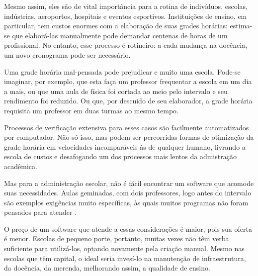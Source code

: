 \documentclass[12pt,a4paper]{article}
\begin{document}
		\par Mesmo assim, eles são de vital importância para a rotina de indivíduos, escolas, indústrias, aeroportos, hospitais e eventos esportivos. Instituições de ensino, em particular, tem custos enormes com a elaboração de suas grades horárias: estima-se que elaborá-las manualmente pode demandar centenas de horas \cite{appleby} de um profissional. No entanto, esse processo é rotineiro: a cada mudança na docência, um novo cronograma pode ser necessário.

		\par Uma grade horária mal-pensada pode prejudicar e muito uma escola. Pode-se imaginar, por exemplo, que esta faça um professor frequentar a escola em um dia a mais, ou que uma aula de física foi cortada ao meio pelo intervalo e seu rendimento foi reduzido. Ou que, por descuido de seu elaborador, a grade horária requisita um professor em duas turmas ao mesmo tempo.

		\par Processos de verificação extensiva para esses casos são facilmente automatizados por computador. Não só isso, mas podem ser percorridas formas de otimização da grade horária em velocidades incomparáveis às de qualquer humano, livrando a escola de custos e desafogando um dos processos mais lentos da admistração acadêmica.


		\par Mas para a administração escolar, não é fácil encontrar um software que acomode suas necessidades. Aulas geminadas, com dois professores, logo antes do intervalo são exemplos exigências muito específicas, às quais muitos programas não foram pensados para atender \cite{nikita}.

		\par O preço de um software que atende a essas considerações é maior, pois sua oferta é menor. Escolas de pequeno porte, portanto, muitas vezes não têm verba suficiente para utilizá-los, optando novamente pela criação manual. Mesmo nas escolas que têm capital, o ideal seria invesí-lo na manutenção de infraestrutura, da docência, da merenda, melhorando assim, a qualidade de ensino.
\end{document}
